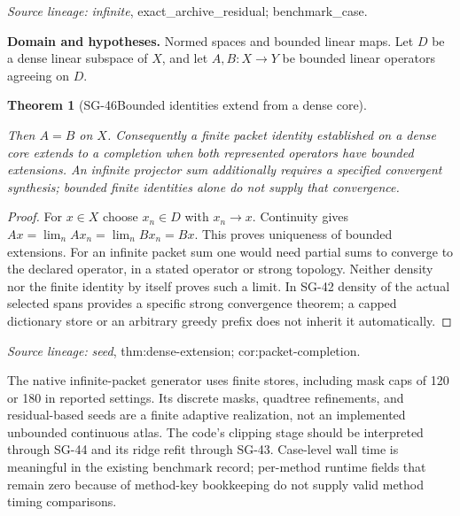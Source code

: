 \documentclass[11pt]{article}
\newtheorem{theorem}{Theorem}[section]
\theoremstyle{definition}\newtheorem{definition}[theorem]{Definition}
\theoremstyle{remark}\newtheorem{remark}[theorem]{Remark}
\begin{document}
\par{\small\color{Teal}\textit{Source lineage:} \textit{infinite}, exact\_archive\_residual; benchmark\_case.}\par

\par{\small\textbf{Domain and hypotheses.} Normed spaces and bounded linear maps. Let $D$ be a dense linear subspace of $X$, and let $A,B:X\to Y$ be bounded linear operators agreeing on $D$.}\par
\begin{theorem}[SG-46\quad Bounded identities extend from a dense core]\label{SG-46}

Then $A=B$ on $X$. Consequently a finite packet identity established on a
dense core extends to a completion when both represented operators have
bounded extensions. An infinite projector sum additionally requires a
specified convergent synthesis; bounded finite identities alone do not
supply that convergence.

\end{theorem}
\begin{proof}

For $x\in X$ choose $x_n\in D$ with $x_n\to x$.
Continuity gives $Ax=\lim_nAx_n=\lim_nBx_n=Bx$.
This proves uniqueness of bounded extensions. For an infinite packet sum one
would need partial sums to converge to the declared operator, in a stated
operator or strong topology. Neither density nor the finite identity by
itself proves such a limit. In SG-42 density of the actual selected spans
provides a specific strong convergence theorem; a capped dictionary store or
an arbitrary greedy prefix does not inherit it automatically.

\end{proof}

\par{\small\color{Teal}\textit{Source lineage:} \textit{seed}, thm:dense-extension; cor:packet-completion.}\par


The native infinite-packet generator uses finite stores, including mask caps
of 120 or 180 in reported settings. Its discrete masks, quadtree refinements,
and residual-based seeds are a finite adaptive realization, not an
implemented unbounded continuous atlas. The code's clipping stage should be
interpreted through SG-44 and its ridge refit through SG-43. Case-level
wall time is meaningful in the existing benchmark record; per-method runtime
fields that remain zero because of method-key bookkeeping do not supply
valid method timing comparisons.
\end{document}
